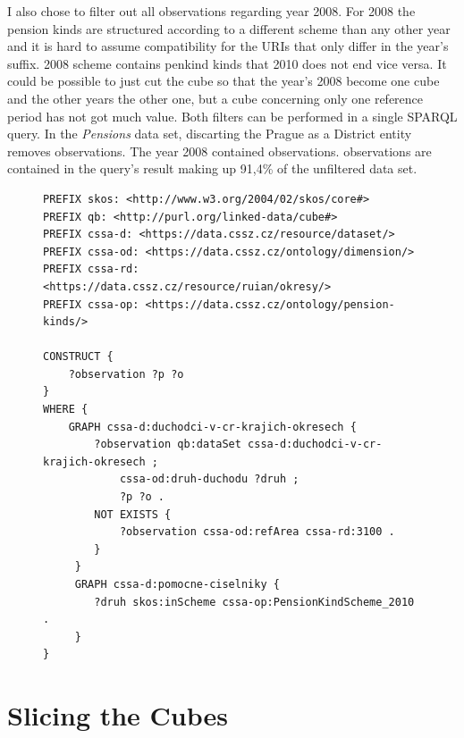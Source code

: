 I also chose to filter out all observations regarding year 2008. For 2008 the pension kinds are structured according to a different scheme than any other year and it is hard to assume compatibility for the URIs that only differ in the year's suffix. 2008 scheme contains penkind kinds that 2010 does not end vice versa. It could be possible to just cut the cube so that the year's 2008 become one cube and the other years the other one, but a cube concerning only one reference period has not got much value. Both filters can be performed in a single SPARQL query. In the \textit{Pensions} data set, discarting the Prague as a District entity removes  observations. The year 2008 contained  observations.  observations are contained in the query's result making up 91,4\% of the unfiltered data set.

\begin{figure}[h]
\begin{lstlisting}[language = SPARQL, caption={SPARQL query to filter the \textit{Pensions} data set}, label={sparqlexample},captionpos=b escapeinside={(*@}{@*)}]
PREFIX skos: <http://www.w3.org/2004/02/skos/core#>
PREFIX qb: <http://purl.org/linked-data/cube#>
PREFIX cssa-d: <https://data.cssz.cz/resource/dataset/>
PREFIX cssa-od: <https://data.cssz.cz/ontology/dimension/>
PREFIX cssa-rd: <https://data.cssz.cz/resource/ruian/okresy/>
PREFIX cssa-op: <https://data.cssz.cz/ontology/pension-kinds/>

CONSTRUCT {
    ?observation ?p ?o
} 
WHERE {
    GRAPH cssa-d:duchodci-v-cr-krajich-okresech {
        ?observation qb:dataSet cssa-d:duchodci-v-cr-krajich-okresech ;
            cssa-od:druh-duchodu ?druh ;
            ?p ?o .
        NOT EXISTS {
            ?observation cssa-od:refArea cssa-rd:3100 .
        }
     }
     GRAPH cssa-d:pomocne-ciselniky {
        ?druh skos:inScheme cssa-op:PensionKindScheme_2010 .
     }
}
\end{lstlisting}
\end{figure}

\section{Slicing the Cubes\label{cssaSlicing}}

